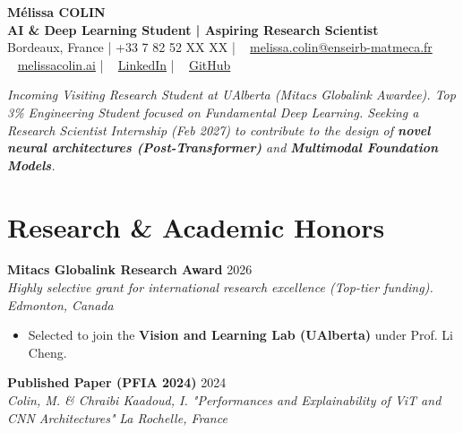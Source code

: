 \documentclass[10pt, letterpaper]{article}
\newcommand{\entry}[4]{
  \noindent \textbf{#1} \hfill #2 \\
  \textit{#3} \hfill \textit{#4} \par 
}
\begin{document}
\begin{center}
    {\fontsize{22}{22}\selectfont \textbf{Mélissa COLIN}} \\[5pt] %
    {\large \textbf{AI \& Deep Learning Student | Aspiring Research Scientist}} \\[5pt] 
    
    \small{ %
    \faMapMarker* Bordeaux, France \quad | \quad \faPhone* +33 7 82 52 XX XX \quad | \quad \faEnvelope~ \href{mailto:melissa.colin@enseirb-matmeca.fr}{melissa.colin@enseirb-matmeca.fr} \\
    \faGlobe~ \href{https://melissacolin.ai}{melissacolin.ai} \quad | \quad \faLinkedin~ \href{https://www.linkedin.com/in/m%C3%A9lissa-colin/}{LinkedIn} \quad | \quad \faGithub~ \href{https://github.com/melissa-colin}{GitHub}
    }
\end{center}

\vspace{2pt}
{\small
\textit{Incoming Visiting Research Student at UAlberta (Mitacs Globalink Awardee). Top 3\% Engineering Student focused on Fundamental Deep Learning. Seeking a Research Scientist Internship (Feb 2027) to contribute to the design of \textbf{novel neural architectures (Post-Transformer)} and \textbf{Multimodal Foundation Models}.}
}
\section{Research \& Academic Honors}

\entry{Mitacs Globalink Research Award}{2026}{Highly selective grant for international research excellence (Top-tier funding).}{Edmonton, Canada}

\begin{itemize}
    \item Selected to join the \textbf{Vision and Learning Lab (UAlberta)} under Prof. Li Cheng.
\end{itemize}

\vspace{6pt}

\entry{Published Paper (PFIA 2024)}{2024}{Colin, M. \& Chraibi Kaadoud, I. "Performances and Explainability of ViT and CNN Architectures"}{La Rochelle, France}
\end{document}
